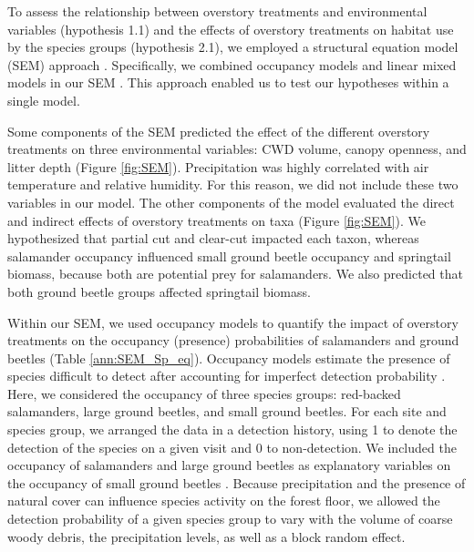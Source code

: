 To assess the relationship between overstory treatments and environmental variables (hypothesis 1.1) and the effects of overstory treatments on habitat use by the species groups (hypothesis 2.1), 
we employed a structural equation model (SEM) approach \citep{graceSpecificationStructuralEquation2010}. 
Specifically, we combined occupancy models and linear mixed models in our SEM \citep{mackenzieOccupancyEstimationModeling2006a,graceSpecificationStructuralEquation2010,josephIntegratingOccupancyModels2016}.
This approach enabled us to test our hypotheses within a single model. 

Some components of the SEM predicted the effect of the different overstory treatments on three environmental variables: CWD volume, canopy openness, and litter depth (Figure \ref{fig:SEM}). 
Precipitation was highly correlated with air temperature and relative humidity. 
For this reason, we did not include these two variables in our model. 
The other components of the model evaluated the direct and indirect effects of overstory treatments on taxa (Figure \ref{fig:SEM}). 
We hypothesized that partial cut and clear-cut impacted each taxon, whereas salamander occupancy influenced small ground beetle occupancy and springtail biomass, because both are potential prey for salamanders. 
We also predicted that both ground beetle groups affected springtail biomass.

Within our SEM, we used occupancy models to quantify the impact of overstory treatments on the occupancy (presence) probabilities of salamanders and ground beetles (Table \ref{ann:SEM_Sp_eq}). 
Occupancy models estimate the presence of species difficult to detect after accounting for imperfect detection probability \citep{mackenzieEstimatingSiteOccupancy2002,baileyEstimatingSiteOccupancy2004,mazerolleMakingGreatLeaps2007,spiersEstimatingSpeciesMisclassification2022}. 
Here, we considered the occupancy of three species groups: red-backed salamanders, large ground beetles, and small ground beetles. 
For each site and species group, we arranged the data in a detection history, using 1 to denote the detection of the species on a given visit and 0 to non-detection. 
We included the occupancy of salamanders and large ground beetles as explanatory variables on the occupancy of small ground beetles \citep{Feldman2023Beaveractivity}. 
Because precipitation and the presence of natural cover can influence species activity on the forest floor, 
we allowed the detection probability of a given species group to vary with the volume of coarse woody debris, the precipitation levels, as well as a block random effect. 

